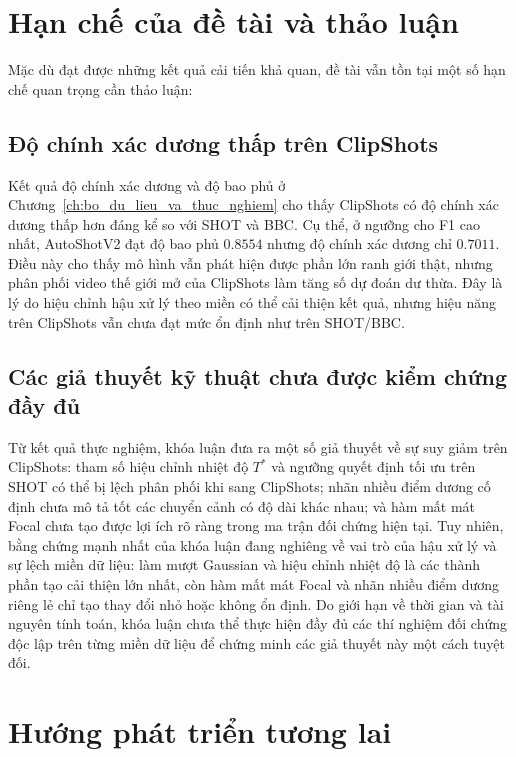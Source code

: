 \section{Hạn chế của đề tài và thảo luận}
\label{sec:limitations}

Mặc dù đạt được những kết quả cải tiến khả quan, đề tài vẫn tồn tại một số hạn chế quan trọng cần thảo luận:

\subsection{Độ chính xác dương thấp trên ClipShots}
Kết quả độ chính xác dương và độ bao phủ ở Chương~\ref{ch:bo_du_lieu_va_thuc_nghiem} cho thấy ClipShots có độ chính xác dương thấp hơn đáng kể so với SHOT và BBC. Cụ thể, ở ngưỡng cho F1 cao nhất, AutoShotV2 đạt độ bao phủ $0.8554$ nhưng độ chính xác dương chỉ $0.7011$. Điều này cho thấy mô hình vẫn phát hiện được phần lớn ranh giới thật, nhưng phân phối video thế giới mở của ClipShots làm tăng số dự đoán dư thừa. Đây là lý do hiệu chỉnh hậu xử lý theo miền có thể cải thiện kết quả, nhưng hiệu năng trên ClipShots vẫn chưa đạt mức ổn định như trên SHOT/BBC.

\subsection{Các giả thuyết kỹ thuật chưa được kiểm chứng đầy đủ}
Từ kết quả thực nghiệm, khóa luận đưa ra một số giả thuyết về sự suy giảm trên ClipShots: tham số hiệu chỉnh nhiệt độ $T^*$ và ngưỡng quyết định tối ưu trên SHOT có thể bị lệch phân phối khi sang ClipShots; nhãn nhiều điểm dương cố định chưa mô tả tốt các chuyển cảnh có độ dài khác nhau; và hàm mất mát Focal chưa tạo được lợi ích rõ ràng trong ma trận đối chứng hiện tại. Tuy nhiên, bằng chứng mạnh nhất của khóa luận đang nghiêng về vai trò của hậu xử lý và sự lệch miền dữ liệu: làm mượt Gaussian và hiệu chỉnh nhiệt độ là các thành phần tạo cải thiện lớn nhất, còn hàm mất mát Focal và nhãn nhiều điểm dương riêng lẻ chỉ tạo thay đổi nhỏ hoặc không ổn định. Do giới hạn về thời gian và tài nguyên tính toán, khóa luận chưa thể thực hiện đầy đủ các thí nghiệm đối chứng độc lập trên từng miền dữ liệu để chứng minh các giả thuyết này một cách tuyệt đối.

\section{Hướng phát triển tương lai}
\label{sec:future_work}

